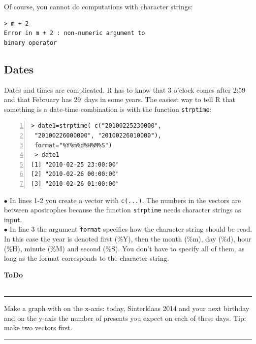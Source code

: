 \documentclass[a4paper,11pt,twocolumn,tablecaptionabove]{scrartcl}
\newenvironment{ToDo} {%
  \begin{flushright}
    \hfill
    \begin{minipage}{0.95\columnwidth}         %
    \textsf{\textbf{ToDo}} \\
      \vspace{-0.85cm}\\
      {\color{Gray}\rule[-0.1cm]{\columnwidth}{1.5pt}}} { %
      {\color{Gray} \rule[0.3cm]{\columnwidth}{1.5pt}}
    \end{minipage}
    \vspace{1em}
  \end{flushright}
  }
\begin{document}
Of course, you cannot do computations with character strings:

\begin{Verbatim}[frame=single,gobble=0]
> m + 2
Error in m + 2 : non-numeric argument to 
binary operator
\end{Verbatim}

\subsection{Dates}

Dates and times are complicated. R has to know that 3 o'clock comes after 2:59 and that February has 29~days in some years. The easiest way to tell R that something is a date-time combination is with the function \texttt{strptime}:

\begin{Verbatim}[frame=single,numbers=left,gobble=0, xleftmargin=0.35cm, numbersep=0.1cm]
> date1=strptime( c("20100225230000", 
 "20100226000000", "20100226010000"), 
 format="%Y%m%d%H%M%S")
 > date1
[1] "2010-02-25 23:00:00" 
[2] "2010-02-26 00:00:00" 
[3] "2010-02-26 01:00:00"
\end{Verbatim}

\noindent $\bullet$  In lines 1-2 you create a vector with \texttt{c(...)}. The numbers in the vectors are between apostrophes because the function \texttt{strptime} needs character strings as input.\\
\noindent $\bullet$ In line 3 the argument \texttt{format} specifies how the character string should be read. In this case the year is denoted first (\%Y), then the month (\%m), day (\%d), hour (\%H), minute (\%M) and second (\%S). You don't have to specify all of them, as long as the format corresponds to the character string.

\begin{ToDo}
Make a graph with on the x-axis: today, Sinterklaas 2014 and your next birthday and on the y-axis the number of presents you expect on each of these days. Tip: make two vectors first.
\end{ToDo}


\end{document}
